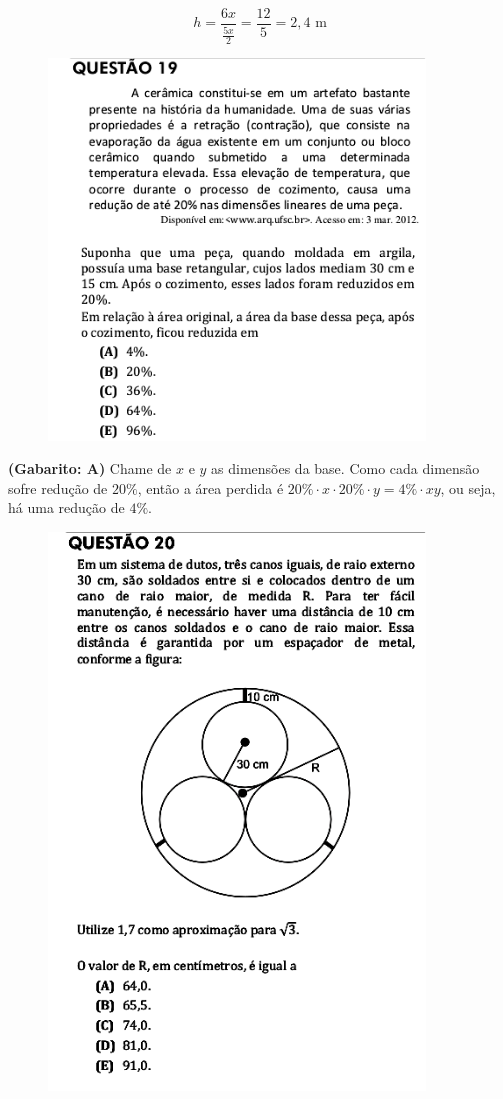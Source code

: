 \documentclass[a4paper]{article}
\begin{document}
\begin{equation*}
h = \frac{6x}{\frac{5x}{2}} = \frac{12}{5} = 2,4\text{ m}
\end{equation*} 
\begin{figure}[H]
	\begin{center}
		\includegraphics[width=10cm]{L5Q19.png}
	\end{center}
\end{figure}
\par\textbf{(Gabarito: A)} Chame de $x$ e $y$ as dimensões da base. Como cada dimensão sofre redução de $20\%$, então a área perdida é $20\%\cdot x\cdot 20\%\cdot y = 4\%\cdot xy$, ou seja, há uma redução de $4\%$.
\begin{figure}[H]
	\begin{center}
		\includegraphics[width=10cm]{L5Q20.png}
	\end{center}
\end{figure}
\end{document}
